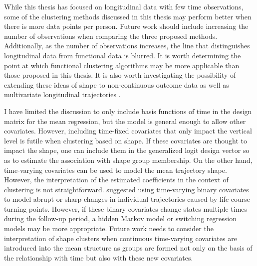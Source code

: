 While this thesis has focused on longitudinal data with few time observations, some of the clustering methods discussed in this thesis may perform better when there is more data points per person. Future work should include increasing the number of observations when comparing the three proposed methods. Additionally, as the number of observations increases, the line that distinguishes longitudinal data from functional data is blurred. It is worth determining the point at which functional clustering algorithms may be more applicable than those proposed in this thesis. It is also worth investigating the possibility of extending these ideas of shape to non-continuous outcome data \cite{jones2001} as well as multivariate longitudinal trajectories \cite{jones2007,d2000}.

I have limited the discussion to only include basis functions of time in the design matrix for the mean regression, but the model is general enough to allow other covariates. However, including time-fixed covariates that only impact the vertical level is futile when clustering based on shape. If these covariates are thought to impact the shape, one can include them in the generalized logit design vector so as to estimate the association with shape group membership. On the other hand, time-varying covariates can be used to model the mean trajectory shape. However, the interpretation of the estimated coefficients in the context of clustering is not straightforward. \Textcite{nagin2003} suggested using time-varying binary covariates to model abrupt or sharp changes in individual trajectories caused by life course turning points. However, if these binary covariates change states multiple times during the follow-up period, a hidden Markov model or switching regression models \cite{quandt1972} may be more appropriate. Future work needs to consider the interpretation of shape clusters when continuous time-varying covariates are introduced into the mean structure as groups are formed not only on the basis of the relationship with time but also with these new covariates. 

